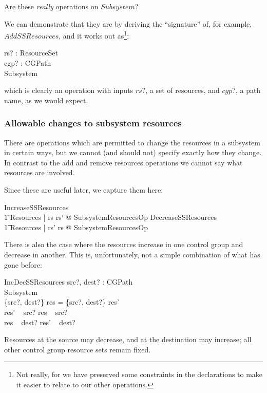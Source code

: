 \documentclass[a4paper,twoside,12pt]{article}
\begin{document}
Are these \emph{really} operations on $Subsystem$?

We can demonstrate that they are by deriving the ``signature'' of, for example, $AddSSResources$,
and it works out as\footnote{Not really,
for we have preserved some constraints in the declarations to make it easier to relate to our other operations.}:

\begin{schema*}
rs? : ResourceSet\\
cgp? : CGPath\\
\Delta Subsystem
\end{schema*}
which is clearly an operation with inputs $rs?$, a set of resources, and $cgp?$, a path name, as we would expect.

\subsubsection{Allowable changes to subsystem resources}

There are operations which are permitted to change the resources in a subsystem in certain ways, but
we cannot (and should not) specify exactly how they change. In contrast to the add and remove resources
operations we cannot say what resources are involved.

Since these are useful later, we capture them here:

\begin{zed}
IncreaseSSResources  \\
	\t1 \exists \Delta Resources | rs \subseteq rs' @ SubsystemResourcesOp 
\also
DecreaseSSResources  \\
	\t1 \exists \Delta Resources | rs' \subseteq rs @ SubsystemResourcesOp 
\end{zed}

There is also the case where the resources increase in one control group and decrease in another.
This is, unfortunately, not a simple combination of what has gone before:


\begin{schema}{IncDecSSResources}
src?, dest? : CGPath \\
\Delta Subsystem \\
\where
\{src?, dest?\} \ndres res = \{src?, dest?\} \ndres res' \\
res' ~ src? \subseteq res ~ src? \\
res ~ dest? \subseteq res' ~ dest?
\end{schema}
Resources at the source may decrease, and at the destination may increase; all other control group resource
sets remain fixed.
\end{document}
